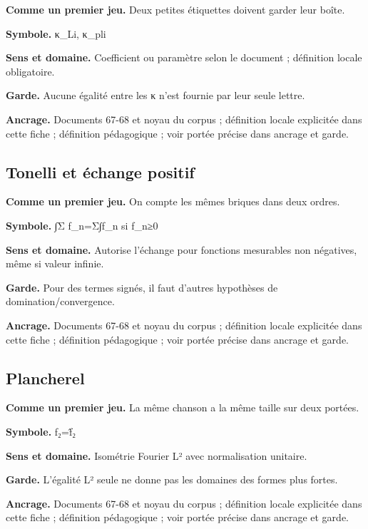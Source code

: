 \documentclass[
  9pt,
  a4paper,
]{article}
\begin{document}
\textbf{Comme un premier jeu.} Deux petites étiquettes doivent garder
leur boîte.

\textbf{Symbole.} κ\_Li, κ\_pli

\textbf{Sens et domaine.} Coefficient ou paramètre selon le document ;
définition locale obligatoire.

\textbf{Garde.} Aucune égalité entre les κ n'est fournie par leur seule
lettre.

\textbf{Ancrage.} Documents 67-68 et noyau du corpus ; définition locale
explicitée dans cette fiche ; définition pédagogique ; voir portée
précise dans ancrage et garde.

\hypertarget{tonelli-et-uxe9change-positif}{%
\subsection{Tonelli et échange
positif}\label{tonelli-et-uxe9change-positif}}

\textbf{Comme un premier jeu.} On compte les mêmes briques dans deux
ordres.

\textbf{Symbole.} ∫Σ f\_n=Σ∫f\_n si f\_n≥0

\textbf{Sens et domaine.} Autorise l'échange pour fonctions mesurables
non négatives, même si valeur infinie.

\textbf{Garde.} Pour des termes signés, il faut d'autres hypothèses de
domination/convergence.

\textbf{Ancrage.} Documents 67-68 et noyau du corpus ; définition locale
explicitée dans cette fiche ; définition pédagogique ; voir portée
précise dans ancrage et garde.

\hypertarget{plancherel}{%
\subsection{Plancherel}\label{plancherel}}

\textbf{Comme un premier jeu.} La même chanson a la même taille sur deux
portées.

\textbf{Symbole.}
\textbar\textbar f\textbar\textbar₂=\textbar\textbar f̂\textbar\textbar₂

\textbf{Sens et domaine.} Isométrie Fourier L² avec normalisation
unitaire.

\textbf{Garde.} L'égalité L² seule ne donne pas les domaines des formes
plus fortes.

\textbf{Ancrage.} Documents 67-68 et noyau du corpus ; définition locale
explicitée dans cette fiche ; définition pédagogique ; voir portée
précise dans ancrage et garde.
\end{document}
